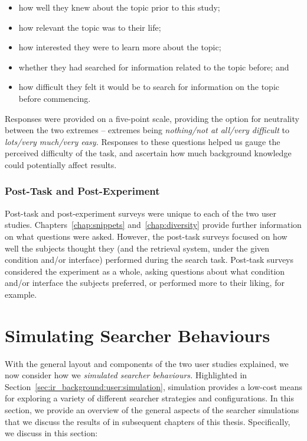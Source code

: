 \begin{itemize}
    \item{how well they knew about the topic prior to this study;}
    \item{how relevant the topic was to their life;}
    \item{how interested they were to learn more about the topic;}
    \item{whether they had searched for information related to the topic before; and}
    \item{how difficult they felt it would be to search for information on the topic before commencing.}
\end{itemize}

Responses were provided on a five-point scale, providing the option for neutrality between the two extremes -- extremes being \emph{nothing/not at all/very difficult} to \emph{lots/very much/very easy.} Responses to these questions helped us gauge the perceived difficulty of the task, and ascertain how much background knowledge could potentially affect results.

\subsubsection{Post-Task and Post-Experiment}
Post-task and post-experiment surveys were unique to each of the two user studies. Chapters~\ref{chap:snippets} and~\ref{chap:diversity} provide further information on what questions were asked. However, the post-task surveys focused on how well the subjects thought they (and the retrieval system, under the given condition and/or interface) performed during the search task. Post-task surveys considered the experiment as a whole, asking questions about what condition and/or interface the subjects preferred, or performed more to their liking, for example.

\section{Simulating Searcher Behaviours}\label{chap:csm:method:simulation}
With the general layout and components of the two user studies explained, we now consider how we \emph{simulated searcher behaviours.} Highlighted in Section~\ref{sec:ir_background:user:simulation}, simulation provides a low-cost means for exploring a variety of different searcher strategies and configurations. In this section, we provide an overview of the general aspects of the  searcher simulations that we discuss the results of in subsequent chapters of this thesis. Specifically, we discuss in this section:

